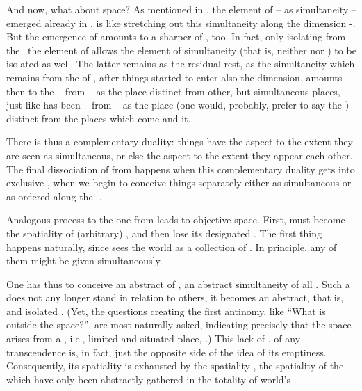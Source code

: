 \pa\label{pa:complementaryDuality} And now, what about space? As mentioned in
, the element of  -- as
simultaneity -- emerged already in .   is like
stretching out this simultaneity along the dimension -.
But the emergence of  amounts to a sharper  of
, too. In fact, only isolating from the \herenow\ the element of
 allows the element of simultaneity (that is, neither  nor
) to be isolated as well.  The latter remains as the residual rest,
as the simultaneity which remains from the  of
\herenow, after things started to enter also the  dimension.
 amounts then to  the  -- from
\herenow -- as the place distinct from other, but simultaneous places, just like
 has been  -- from \herenow -- as the place (one
would, probably, prefer to say the ) distinct from the places
which come  and  it.

There is thus a complementary duality: things have the  aspect to
the extent they are seen as simultaneous, or else the  aspect to
the extent they appear  each other.  The final dissociation of
 from  happens when this complementary duality
gets  into exclusive , when we begin to
conceive things separately either as simultaneous or as ordered along the
-.

\pa
Analogous process to the one from  
leads to objective space. First,  must become the 
spatiality of (arbitrary) , and then lose its designated 
. The first thing happens naturally, since  
sees the world as a collection of . In principle, any of 
them might be given simultaneously. 

One has thus to conceive an abstract  
of , an abstract simultaneity of all 
. Such a  does not any longer stand in relation 
to others, it becomes an abstract, that is,  and isolated 
. (Yet, the 
questions creating the first antinomy, like ``What is outside the 
space?'', are most naturally asked, indicating precisely that 
the  space arises from a , i.e., limited and situated 
place, .) This lack of , of any transcendence 
is, in fact, just the opposite side of the idea of its emptiness. 
Consequently, its spatiality is exhausted by the 
spatiality , the spatiality of the  which have only 
been abstractly gathered in the totality of world's . 

